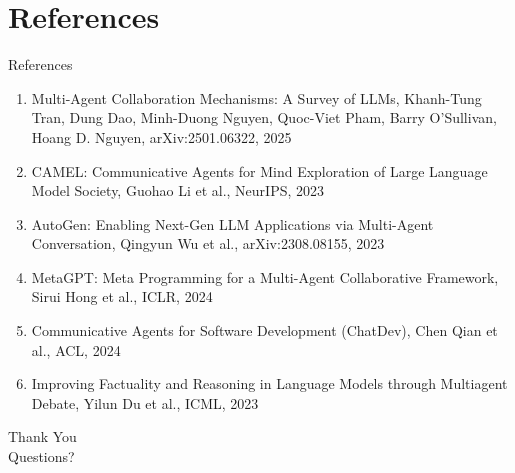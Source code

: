 \documentclass[10pt]{beamer}
\begin{document}
\section{References}
\begin{frame}[allowframebreaks]{References}
  \footnotesize
  \begin{enumerate}
    \item Multi-Agent Collaboration Mechanisms: A Survey of LLMs, Khanh-Tung Tran, Dung Dao, Minh-Duong Nguyen, Quoc-Viet Pham, Barry O'Sullivan, Hoang D. Nguyen, arXiv:2501.06322, 2025
    \item CAMEL: Communicative Agents for Mind Exploration of Large Language Model Society, Guohao Li et al., NeurIPS, 2023
    \item AutoGen: Enabling Next-Gen LLM Applications via Multi-Agent Conversation, Qingyun Wu et al., arXiv:2308.08155, 2023
    \item MetaGPT: Meta Programming for a Multi-Agent Collaborative Framework, Sirui Hong et al., ICLR, 2024
    \item Communicative Agents for Software Development (ChatDev), Chen Qian et al., ACL, 2024
    \item Improving Factuality and Reasoning in Language Models through Multiagent Debate, Yilun Du et al., ICML, 2023
  \end{enumerate}
\end{frame}

\begin{frame}[plain]
  \begin{center}
    {\Huge Thank You}\\[1em]
    {\large Questions?}
  \end{center}
\end{frame}
\end{document}
